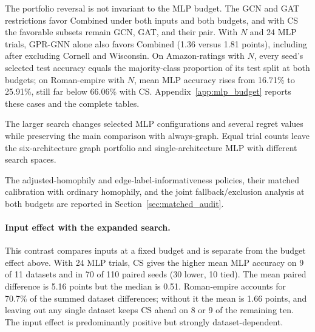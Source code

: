 The portfolio reversal is not invariant to the MLP budget. The GCN and GAT restrictions favor Combined under both inputs and both budgets, and with CS the favorable subsets remain GCN, GAT, and their pair. With $N$ and 24 MLP trials, GPR-GNN alone also favors Combined (1.36 versus 1.81 points), including after excluding Cornell and Wisconsin. On Amazon-ratings with $N$, every seed's selected test accuracy equals the majority-class proportion of its test split at both budgets; on Roman-empire with $N$, mean MLP accuracy rises from 16.71\% to 25.91\%, still far below 66.06\% with CS. Appendix~\ref{app:mlp_budget} reports these cases and the complete tables.

The larger search changes selected MLP configurations and several regret values while preserving the main comparison with always-graph. Equal trial counts leave the six-architecture graph portfolio and single-architecture MLP with different search spaces.

The adjusted-homophily and edge-label-informativeness policies, their matched calibration with ordinary homophily, and the joint fallback/exclusion analysis at both budgets are reported in Section~\ref{sec:matched_audit}.

\paragraph{Input effect with the expanded search.}
This contrast compares inputs at a fixed budget and is separate from the budget effect above. With 24 MLP trials, CS gives the higher mean MLP accuracy on 9 of 11 datasets and in 70 of 110 paired seeds (30 lower, 10 tied). The mean paired difference is 5.16 points but the median is 0.51. Roman-empire accounts for 70.7\% of the summed dataset differences; without it the mean is 1.66 points, and leaving out any single dataset keeps CS ahead on 8 or 9 of the remaining ten. The input effect is predominantly positive but strongly dataset-dependent.
